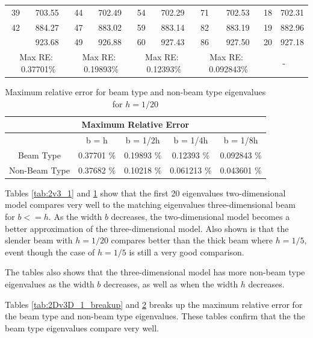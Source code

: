 \begin{table}[ht]
{{\begin{tabular}{|cc|cc|cc|cc||cc|}
		{39} & 703.55 & {44} & 702.49 & {54} & 702.29 & {71} & 702.53 & {18} & {702.31} \\
		{42} & 884.27 & {47} & 883.02 & {59} & 883.14 & {82} & 883.19 & {19} & {882.96} \\
		\rowcolor{lightgray}{44} & 923.68 & {49} & 926.88 & {60} & 927.43 & {86} & 927.50 & {20} & {927.18} \\
		\hline
		\hline
		\multicolumn{2}{|c|}{Max RE: \  0.37701\%} &\multicolumn{2}{c|}{Max RE: \ 0.19893\%}  & \multicolumn{2}{c|}{Max RE: \  0.12393\%}  & \multicolumn{2}{c||}{Max RE: \ 0.092843\%}& \multicolumn{2}{c|}{-} \\
		\hline
	\end{tabular}%
	\label{tab:2v3_2}%
}}
\end{table}%
\FloatBarrier

\begin{table}[htbp]
	\centering
	\caption{Maximum relative error for beam type and non-beam type eigenvalues for $h = 1/20$}
	\begin{tabular}{|c|cccc|}
		\hline
		\multicolumn{5}{|c|}{Maximum Relative Error} \\
		\hline
		\hline
		& {b = h} & {b = 1/2h} & {b = 1/4h} & {b = 1/8h} \\
		\hline
		Beam Type & 0.37701 \% & 0.19893 \% & 0.12393 \% & 0.092843 \% \\
		Non-Beam Type & 0.37682 \% & 0.10218 \% & 0.061213 \% & 0.043601 \% \\
		\hline
	\end{tabular}%
	\label{tab:2v3_2_split}%
\end{table}%
\FloatBarrier

Tables \ref{tab:2v3_1} and \ref{tab:2v3_2} show that the first 20 eigenvalues two-dimensional model compares very well to the matching eigenvalues three-dimensional beam for $b<=h$. As the width $b$ decreases, the two-dimensional model becomes a better approximation of the three-dimensional model. Also shown is that the slender beam with $h = 1/20$ compares better than the thick beam where $h = 1/5$, event though the case of $h=1/5$ is still a very good comparison. 

The tables also shows that the three-dimensional model has more non-beam type eigenvalues as the width $b$ decreases, as well as when the width $h$ decreases.

Tables \ref{tab:2Dv3D_1_breakup} and \ref{tab:2v3_2_split} breaks up the maximum relative error for the beam type and non-beam type eigenvalues. These tables confirm that the the beam type eigenvalues compare very well.


